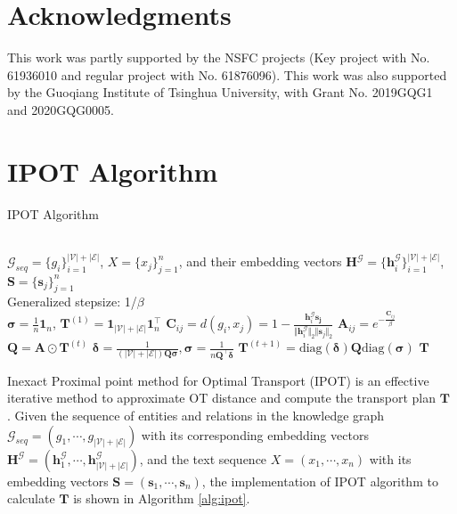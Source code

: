 \documentclass[11pt,a4paper]{article}
\begin{document}
\section*{Acknowledgments}

This work was partly supported by the NSFC projects (Key project with No. 61936010 and regular project with No. 61876096). This work was also supported by the Guoqiang Institute of Tsinghua University, with Grant No. 2019GQG1 and 2020GQG0005. 




\appendix

\section{IPOT Algorithm}
\label{app:ipot}

\begin{algorithm}[htb] 
\caption{IPOT Algorithm} 
\label{alg:ipot} 
\begin{algorithmic}[1]
\REQUIRE ~~\\
$\mathcal{G}_{seq}=\{g_i\}_{i=1}^{|\mathcal{V}|+|\mathcal{E}|}$, $X=\{x_j\}_{j=1}^n$, and their embedding vectors $\bm{H}^{\mathcal{G}}=\{\bm{h}_i^{\mathcal{G}}\}_{i=1}^{|\mathcal{V}|+|\mathcal{E}|}$, $\bm{S}=\{\bm{s}_j\}_{j=1}^n$  \\
Generalized stepsize: 1/$\beta$ \\
\STATE $\bm{\sigma}=\frac{1}{n}\bm{1}_{n}$, $\bm{T}^{(1)}=\bm{1}_{|\mathcal{V}|+|\mathcal{E}|} \bm{1}_{n}^\top$
\STATE $\bm{C}_{ij}=d(g_i,x_j)=1-\frac{\bm{h}_i^\mathcal{G}\bm{s_j}}{\Vert \bm{h}_i^\mathcal{G}\Vert_2 \Vert\bm{s}_j\Vert_2}$
\STATE $\bm{A}_{ij}=e^{-\frac{\bm{C}_{ij}}{\beta}}$
\STATE $\bm{Q}=\bm{A}\odot\bm{T}^{(t)}$
\STATE $\bm{\delta}=\frac{1}{(|\mathcal{V}|+|\mathcal{E}|)\bm{Q}\bm{\sigma}}, \bm{\sigma}=\frac{1}{n\bm{Q}^\top \bm{\delta}}$
\ENDFOR
\STATE $\bm{T}^{(t+1)}=\mathrm{diag}(\bm{\delta})\bm{Q}\mathrm{diag}(\bm{\sigma})$
\ENDFOR
\RETURN $\bm{T}$
\end{algorithmic}
\end{algorithm}

Inexact Proximal point method for Optimal Transport (IPOT) is an effective iterative method to approximate OT distance and compute the transport plan $\bm{T}$ \cite{xie2019ipot}. Given the sequence of entities and relations in the knowledge graph $\mathcal{G}_{seq}=(g_1,\cdots,g_{|\mathcal{V}|+|\mathcal{E}|})$ with its corresponding embedding vectors $\bm{H}^{\mathcal{G}}=(\bm{h}_1^{\mathcal{G}},\cdots,\bm{h}_{|\mathcal{V}|+|\mathcal{E}|}^{\mathcal{G}})$, and the text sequence $X=(x_1,\cdots,x_n)$ with its embedding vectors $\bm{S}=(\bm{s}_1,\cdots,\bm{s}_n)$, the implementation of IPOT algorithm to calculate $\bm{T}$ is shown in Algorithm \ref{alg:ipot}.
\end{document}
